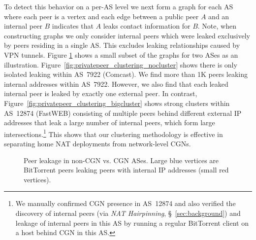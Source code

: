 \documentclass[10pt]{sig-alternate-05-2015}
\newcommand\xref[1]{\S~\ref{#1}}
\begin{document}
To detect this behavior on a per-AS level we next form a graph for
each AS where each peer is a vertex and each edge between a public
peer $A$ and an internal peer $B$ indicates that $A$ leaks contact
information for $B$.  Note, when constructing graphs we only
consider internal peers which were leaked exclusively by peers
residing in a single AS.  This excludes leaking relationships caused
by VPN tunnels.  Figure \ref{fig:privatepeer_clustering} shows a
small subset of the graphs for two 
ASes as an illustration.
Figure~\ref{fig:privatepeer_clustering_nocluster} shows there is
only isolated leaking within AS~7922 (Comcast).  We find more 
than 1K peers leaking internal addresses within AS~7922.  However,
we also find that each leaked internal peer is leaked by exactly one
external peer.
In contrast, Figure~\ref{fig:privatepeer_clustering_bigcluster} shows strong 
clusters within AS~12874 (FastWEB) consisting of multiple peers behind 
different external IP addresses that leak a large number of internal peers, 
which form large intersections.\footnote{We manually confirmed CGN presence 
in AS~12874 and also verified the discovery of internal peers (via \textit{NAT 
Hairpinning}, \xref{sec:background}) and leakage of internal peers in 
this AS by running a regular BitTorrent client on a host behind CGN in this 
AS.} This shows that our clustering methodology is effective in 
separating home NAT deployments from network-level CGNs.


\begin{figure}
  \begin{center}
  \hfill
  \caption{Peer leakage in non-CGN vs. CGN ASes. Large blue vertices are 
  BitTorrent peers leaking peers with internal IP addresses (small red 
  vertices).}
   \label{fig:privatepeer_clustering}
  \end{center}
    \vspace{-1em}
\end{figure}
\end{document}
